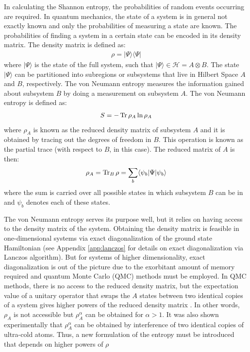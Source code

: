 	In calculating the Shannon entropy, the probabilities of random events occurring are required. In quantum mechanics, the state of a system is in general not exactly known and only the probabilities of measuring a state are known. The probabilities of finding a system in a certain state can be encoded in its density matrix. The density matrix is defined as:	
	\begin{align}
	\label{eq:densityMatrix}
	\rho = \vert \Psi \rangle \langle \Psi \vert
	\end{align}
	where $\vert\Psi\rangle$ is the state of the full system, such that $\vert \Psi \rangle \in \mathcal{H} = A \otimes B$. The state $\vert \Psi \rangle$ can be partitioned into subregions or subsystems that live in Hilbert Space $A$ and $B$, respectively. The von Neumann entropy measures the information gained about subsystem $B$ by doing a measurement on subsystem $A$. The von Neumann entropy is defined as:
	\begin{equation}
	S = -\operatorname{Tr}\rho_{A} \ln{\rho_A}
	\label{eq:vonNeumannEntropy}
	\end{equation}
	where $\rho_A$ is known as the reduced density matrix of subsystem $A$ and it is obtained by tracing out the degrees of freedom in $B$. This operation is known as the partial trace (with respect to $B$, in this case). The reduced matrix of $A$ is then:
	\begin{equation}
	\rho_{A} = \operatorname{Tr}_B \rho = \sum_b \langle \psi_b \vert \Psi \vert \psi_b \rangle
	\label{eq:partialTrace}
	\end{equation}
	where the sum is carried over all possible states in which subsystem $B$ can be in and $\psi_b$ denotes each of these states.
	
	The von Neumann entropy serves its purpose well, but it relies on having access to the density matrix of the system. Obtaining the density matrix is feasible in one-dimensional systems via exact diagonalization of the ground state Hamiltonian (see Appendix \ref{app:lanczos} for details on exact diagonalization via Lanczos algorithm). But for systems of higher dimensionality, exact diagonalization is out of the picture due to the exorbitant amount of memory required and quantum Monte Carlo (QMC) methods must be employed. In QMC methods, there is no access to the reduced density matrix, but the expectation value of a unitary operator that swaps the $A$ states between two identical copies of a system gives higher powers of the reduced density matrix \cite{Hastings:2010dc}. In other words, $\rho_{A}$ is not accessible but $\rho_{A}^{\alpha}$ can be obtained for $\alpha > 1$. It was also shown experimentally \cite{Islam:2015cm}  that $\rho_A^{\alpha}$ can be obtained by interference of two identical copies of ultra-cold atoms. Thus, a new formulation of the entropy must be introduced that depends on higher powers of $\rho$
	
